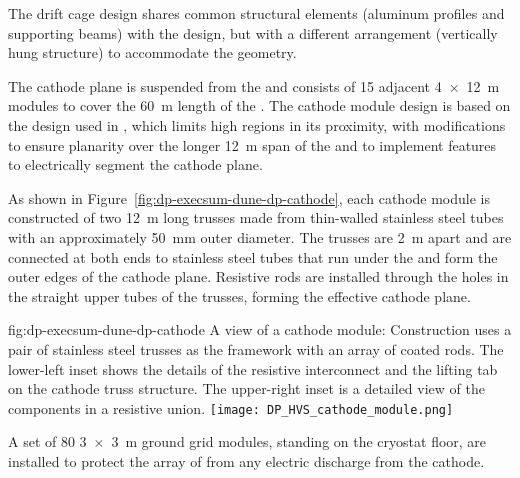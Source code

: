 The drift cage design shares common structural elements (aluminum profiles and  supporting beams) with the   design, but with a different arrangement (vertically hung structure) to accommodate the  geometry.

The cathode plane  is suspended from the  and  %
consists of \num{15} adjacent \SI{4x12}{m}  modules to cover the  \SI{60}{m} length of the  . The cathode module design is based on the design used in , which  limits high \efield
regions in its proximity, with modifications to ensure planarity over the longer \SI{12}{m} span of the  and to implement features to electrically segment the cathode plane.

As shown in  Figure~\ref{fig:dp-execsum-dune-dp-cathode}, each cathode module is constructed of two \SI{12}{m} long trusses made from thin-walled stainless steel tubes with an  approximately \SI{50}{mm}  outer diameter. %
The trusses are \SI{2}{m} apart and are connected at both ends to stainless steel tubes that run under the  and form the outer edges of the cathode plane. %
Resistive rods are installed through the holes in the straight upper tubes of the trusses, forming the effective cathode plane. %

\begin{dunefigure}{fig:dp-execsum-dune-dp-cathode}
{A view of a  cathode module:  Construction uses a pair of stainless steel trusses as the framework with an array of coated  rods. 
The lower-left inset shows the details of the resistive interconnect and the lifting tab on the cathode truss structure. The upper-right inset is a detailed view of the components in a resistive union.}
\texttt{[image: DP\_HVS\_cathode\_module.png]}
\end{dunefigure}

A set of 80 \SI{3x3}{m} ground grid modules, standing on the cryostat floor, are installed to protect the array of  from any electric discharge from the cathode.


